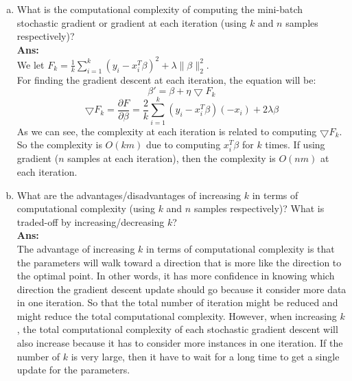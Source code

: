 \documentclass[11pt]{article}
\begin{document}
\begin{enumerate}[(a)]
\item What is the computational complexity of computing the mini-batch stochastic gradient or gradient at each iteration (using $k$ and $n$ samples respectively)?\\
\textbf{Ans:}\\
We let $F_k = \frac{1}{k}\sum_{i=1}^k(y_i - x_i^T\beta)^2 + \lambda\|\beta\|_2^2$.\\
For finding the gradient descent at each iteration, the equation will be:
$$\beta' = \beta + \eta \bigtriangledown F_k$$
$$\bigtriangledown F_k = \frac{\partial F}{\partial \beta} = \frac{2}{k}\sum_{i=1}^{k}(y_i - x_i^T\beta)(-x_i) + 2\lambda\beta$$
As we can see, the complexity at each iteration is related to computing $\bigtriangledown F_k$. So the complexity is $O(km)$ due to computing $x_i^T\beta$ for $k$ times. If using gradient ($n$ samples at each iteration), then the complexity is $O(nm)$ at each iteration.

\item What are the advantages/disadvantages of increasing $k$ in terms of computational complexity (using $k$ and $n$ samples respectively)? What is traded-off by increasing/decreasing $k$?\\
\textbf{Ans:}\\
The advantage of increasing $k$ in terms of computational complexity is that the parameters will walk toward a direction that is more like the direction to the optimal point. In other words, it has more confidence in knowing which direction the gradient descent update should go because it consider more data in one iteration. So that the total number of iteration might be reduced and might reduce the total computational complexity. However, when increasing $k$, the total computational complexity of each stochastic gradient descent will also increase because it has to consider more instances in one iteration. If the number of $k$ is very large, then it have to wait for a long time to get a single update for the parameters.\\


\end{enumerate}
\end{document}
